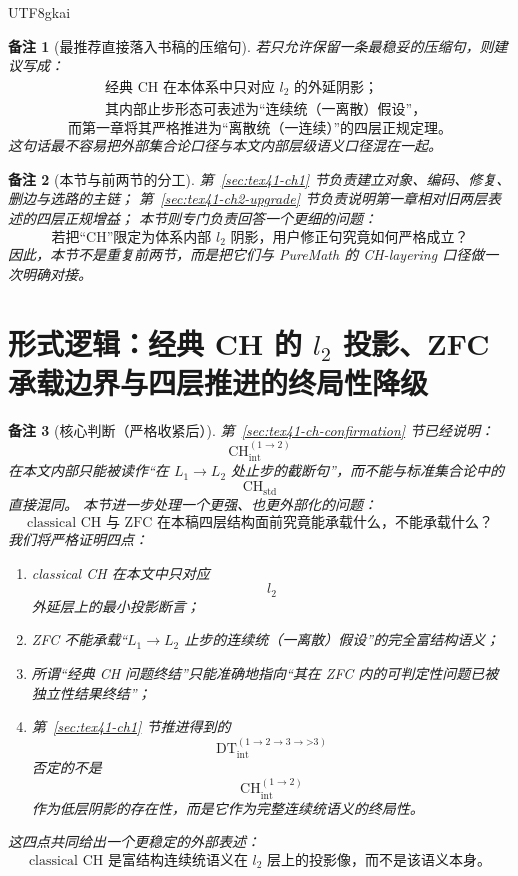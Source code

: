 \documentclass[12pt]{article}
\newtheorem{remark}{备注}[section]
\newcommand{\CHstd}{\mathrm{CH}_{\mathrm{std}}}
\newcommand{\CHint}{\mathrm{CH}_{\mathrm{int}}}
\newcommand{\DTint}{\mathrm{DT}_{\mathrm{int}}}
\begin{document}
\begin{CJK*}{UTF8}{gkai}
\begin{remark}[最推荐直接落入书稿的压缩句]
若只允许保留一条最稳妥的压缩句，则建议写成：
\[
\boxed{
  \begin{aligned}
    &\text{经典 CH 在本体系中只对应 }l_2\text{ 的外延阴影；}\\
    &\text{其内部止步形态可表述为“连续统（一离散）假设”，}
  \end{aligned}
}
\]
\[
\boxed{
  \text{而第一章将其严格推进为“离散统（一连续）”的四层正规定理。}
}
\]
这句话最不容易把外部集合论口径与本文内部层级语义口径混在一起。
\end{remark}

\begin{remark}[本节与前两节的分工]
第~\ref{sec:tex41-ch1} 节负责建立对象、编码、修复、删边与选路的主链；
第~\ref{sec:tex41-ch2-upgrade} 节负责说明第一章相对旧两层表述的四层正规增益；
本节则专门负责回答一个更细的问题：
\[
  \text{若把“CH”限定为体系内部 }l_2\text{ 阴影，用户修正句究竟如何严格成立？}
\]
因此，本节不是重复前两节，而是把它们与 PureMath 的 CH-layering 口径做一次明确对接。
\end{remark}

\section{形式逻辑：经典 CH 的 $l_2$ 投影、ZFC 承载边界与四层推进的终局性降级}
\label{sec:tex41-ch-zfc-boundary}

\begin{remark}[核心判断（严格收紧后）]
第~\ref{sec:tex41-ch-confirmation} 节已经说明：
\[
  \CHint^{(1\to2)}
\]
在本文内部只能被读作“在 $L_1\to L_2$ 处止步的截断句”，而不能与标准集合论中的
\[
  \CHstd
\]
直接混同。
本节进一步处理一个更强、也更外部化的问题：
\[
  \text{classical CH 与 ZFC 在本稿四层结构面前究竟能承载什么，不能承载什么？}
\]
我们将严格证明四点：
\begin{enumerate}
  \item classical CH 在本文中只对应
  \[
    l_2
  \]
  外延层上的最小投影断言；
  \item ZFC 不能承载“$L_1\to L_2$ 止步的连续统（一离散）假设”的完全富结构语义；
  \item 所谓“经典 CH 问题终结”只能准确地指向“其在 ZFC 内的可判定性问题已被独立性结果终结”；
  \item 第~\ref{sec:tex41-ch1} 节推进得到的
  \[
    \DTint^{(1\to2\to3\to\text{>3})}
  \]
  否定的不是
  \[
    \CHint^{(1\to2)}
  \]
  作为低层阴影的存在性，而是它作为完整连续统语义的终局性。
\end{enumerate}
这四点共同给出一个更稳定的外部表述：
\[
\boxed{
  \text{classical CH 是富结构连续统语义在 }l_2\text{ 层上的投影像，而不是该语义本身。}
}
\]
\end{remark}


\end{CJK*}
\end{document}
